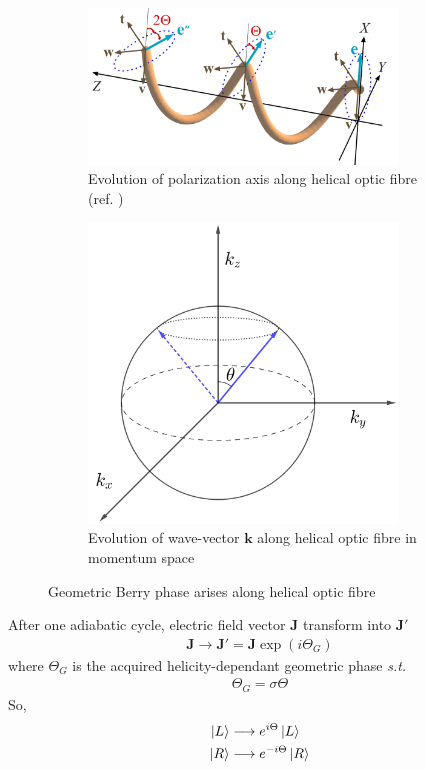 \documentclass[11pt,a4paper]{article}
\numberwithin{equation}{section}
\begin{document}
\begin{figure}[t]
	\begin{subfigure}[H]{0.62\textwidth}
		\centering
		\includegraphics[width=0.9\textwidth]{berry.png}
		\caption{Evolution of polarization axis along helical optic fibre (ref. \cite{bliokh 09})}
		\label{fig:berry a}
	\end{subfigure}
	\hfil
	\begin{subfigure}[H]{0.35\textwidth}
		\centering
		\includegraphics[width=0.9\textwidth]{poincare-berry.png}
		\caption{Evolution of wave-vector $\boldsymbol{k}$ along helical optic fibre in momentum space}
		\label{fig:berry b}
	\end{subfigure}
	\caption{Geometric Berry phase arises along helical optic fibre}
\end{figure} 

After one adiabatic cycle, electric field vector $\boldsymbol{J}$ transform into $\boldsymbol{J'}$
\begin{align}
\boldsymbol{J}\longrightarrow\boldsymbol{J'}=\boldsymbol{J}\exp(i\Theta_G)
\end{align} where $\Theta_G$ is the acquired helicity-dependant geometric phase \textit{s.t.} 
\begin{align}
	\Theta_G= \sigma\Theta
\end{align}
So,
\begin{align}
	\ket{L}&\longrightarrow e^{i\Theta}\ket{L}\\
	\ket{R}&\longrightarrow e^{-i\Theta}\ket{R}
\end{align}
\end{document}
